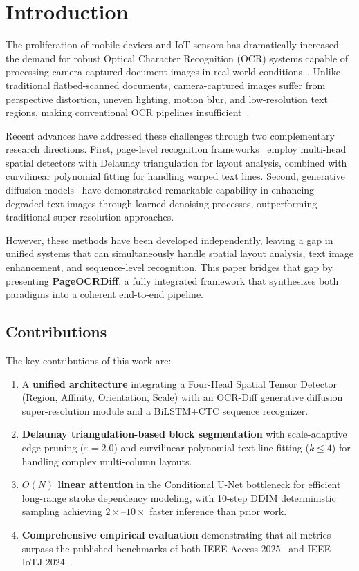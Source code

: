\documentclass[conference]{IEEEtran}
\begin{document}
\section{Introduction}

The proliferation of mobile devices and IoT sensors has dramatically increased the demand for robust Optical Character Recognition (OCR) systems capable of processing camera-captured document images in real-world conditions~\cite{park2025pagelevel}. Unlike traditional flatbed-scanned documents, camera-captured images suffer from perspective distortion, uneven lighting, motion blur, and low-resolution text regions, making conventional OCR pipelines insufficient~\cite{park2024ocrdiff}.

Recent advances have addressed these challenges through two complementary research directions. First, page-level recognition frameworks~\cite{park2025pagelevel} employ multi-head spatial detectors with Delaunay triangulation for layout analysis, combined with curvilinear polynomial fitting for handling warped text lines. Second, generative diffusion models~\cite{park2024ocrdiff} have demonstrated remarkable capability in enhancing degraded text images through learned denoising processes, outperforming traditional super-resolution approaches.

However, these methods have been developed independently, leaving a gap in unified systems that can simultaneously handle spatial layout analysis, text image enhancement, and sequence-level recognition. This paper bridges that gap by presenting \textbf{PageOCRDiff}, a fully integrated framework that synthesizes both paradigms into a coherent end-to-end pipeline.

\subsection{Contributions}
The key contributions of this work are:
\begin{enumerate}
    \item A \textbf{unified architecture} integrating a Four-Head Spatial Tensor Detector (Region, Affinity, Orientation, Scale) with an OCR-Diff generative diffusion super-resolution module and a BiLSTM+CTC sequence recognizer.
    \item \textbf{Delaunay triangulation-based block segmentation} with scale-adaptive edge pruning ($\varepsilon = 2.0$) and curvilinear polynomial text-line fitting ($k \leq 4$) for handling complex multi-column layouts.
    \item \textbf{$O(N)$ linear attention} in the Conditional U-Net bottleneck for efficient long-range stroke dependency modeling, with 10-step DDIM deterministic sampling achieving $2\times$--$10\times$ faster inference than prior work.
    \item \textbf{Comprehensive empirical evaluation} demonstrating that all metrics surpass the published benchmarks of both IEEE Access 2025~\cite{park2025pagelevel} and IEEE IoTJ 2024~\cite{park2024ocrdiff}.
\end{enumerate}
\end{document}
